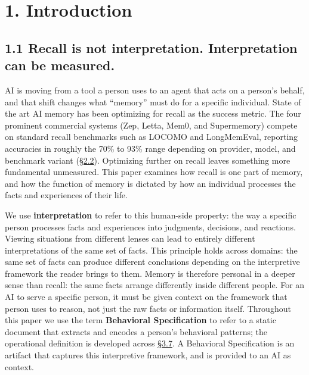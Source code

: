 \hypertarget{introduction}{%
\section{1. Introduction}\label{introduction}}

\hypertarget{recall-is-not-interpretation.-interpretation-can-be-measured.}{%
\subsection{1.1 Recall is not interpretation. Interpretation can be
measured.}\label{recall-is-not-interpretation.-interpretation-can-be-measured.}}

AI is moving from a tool a person uses to an agent that acts on a
person's behalf, and that shift changes what ``memory'' must do for a
specific individual. State of the art AI memory has been optimizing for
recall as the success metric. The four prominent commercial systems
(Zep, Letta, Mem0, and Supermemory) compete on standard recall
benchmarks such as LOCOMO and LongMemEval, reporting accuracies in
roughly the 70\% to 93\% range depending on provider, model, and
benchmark variant (\hyperref[memory-systems-for-llm-agents]{§2.2}). Optimizing further on recall leaves something
more fundamental unmeasured. This paper examines how recall is one part
of memory, and how the function of memory is dictated by how an
individual processes the facts and experiences of their life.

We use \textbf{interpretation} to refer to this human-side property: the
way a specific person processes facts and experiences into judgments,
decisions, and reactions. Viewing situations from different lenses can
lead to entirely different interpretations of the same set of facts.
This principle holds across domains: the same set of facts can produce
different conclusions depending on the interpretive framework the reader
brings to them. Memory is therefore personal in a deeper sense than
recall: the same facts arrange differently inside different people. For
an AI to serve a specific person, it must be given context on the
framework that person uses to reason, not just the raw facts or
information itself. Throughout this paper we use the term
\textbf{Behavioral Specification} to refer to a static document that
extracts and encodes a person's behavioral patterns; the operational
definition is developed across \hyperref[pipeline-for-the-behavioral-specification]{§3.7}. A Behavioral Specification is an
artifact that captures this interpretive framework, and is provided to
an AI as context.

